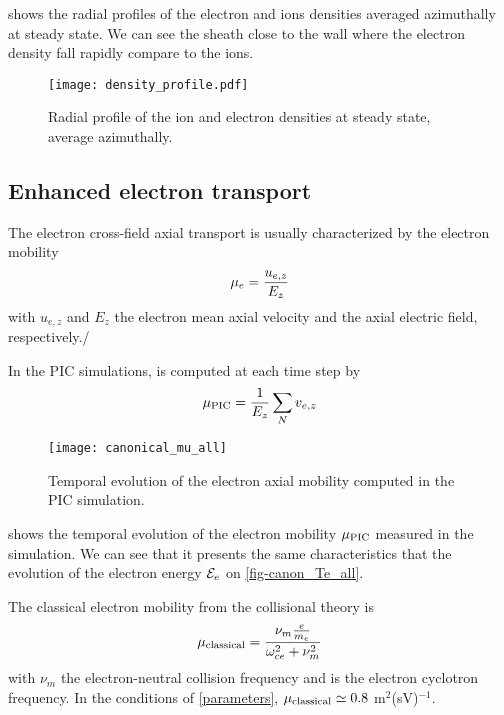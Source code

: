    shows the radial profiles of the electron and ions densities averaged azimuthally at steady state.
  We can see the sheath close to the wall where the electron density fall rapidly compare to the ions.
  
  \begin{figure}[hbtp]
    \centering
    \texttt{[image: density\_profile.pdf]}
    \caption{Radial profile of the ion and electron densities at steady state, average azimuthally.}
    \label{fig-profiles}
  \end{figure}
  
  \subsection{Enhanced electron transport} \label{subsec-canonmue}
  The electron cross-field axial transport is usually characterized by the electron mobility
  \begin{equation} \label{eq-mobdef}
    \mu_e = \frac{u_{e, z}}{E_z}
  \end{equation}
  with $u_{e,z}$ and $E_z$ the electron mean axial velocity and the axial electric field, respectively./
  
  In the \ac{PIC} simulations, \mob is computed at each time step by
  \begin{equation} \label{eq-mobpic}
    \mu_{\mathrm{PIC}} = \frac{1}{E_z} \sum_N v_{e,z}
  \end{equation}

  \begin{figure}[hbtp]
    \centering
    \texttt{[image: canonical\_mu\_all]}
    \caption{Temporal evolution of the electron axial mobility computed in the \ac{PIC} simulation.}
    \label{fig-canon_mu}
  \end{figure}
  
   shows the temporal evolution of the electron mobility $\mu_{\mathrm{PIC}}$ measured in the simulation.
  We can see that it presents the same characteristics that the evolution of the electron energy ${\mathcal{E}_e}$ on \cref{fig-canon_Te_all}.
  
  The classical electron mobility from the collisional theory is \citep{lafleur2016a}
  \begin{equation} \label{eq-muclass}
    \mu_{\mathrm{classical}} = \frac{\nu_m \frac{e}{m_e}}{\omega_{ce}^2 + \nu_m^2}
  \end{equation}
  with $\nu_m$ the electron-neutral  collision frequency and \oce is the electron cyclotron frequency.
  In the conditions of \cref{parameters}, $\mu_{\mathrm{classical}} \simeq 0.8$ m$^2$(sV)$^{-1}$.
  
